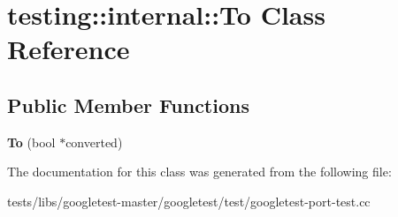\hypertarget{classtesting_1_1internal_1_1To}{}\section{testing\+:\+:internal\+:\+:To Class Reference}
\label{classtesting_1_1internal_1_1To}
\subsection*{Public Member Functions}
\begin{DoxyCompactItemize}
\item 
\mbox{\label{classtesting_1_1internal_1_1To_a447354e55d855ed0f1a1de8b2b54d345}} 
{\bfseries To} (bool $\ast$converted)
\end{DoxyCompactItemize}


The documentation for this class was generated from the following file\+:\begin{DoxyCompactItemize}
\item 
tests/libs/googletest-\/master/googletest/test/googletest-\/port-\/test.\+cc\end{DoxyCompactItemize}
